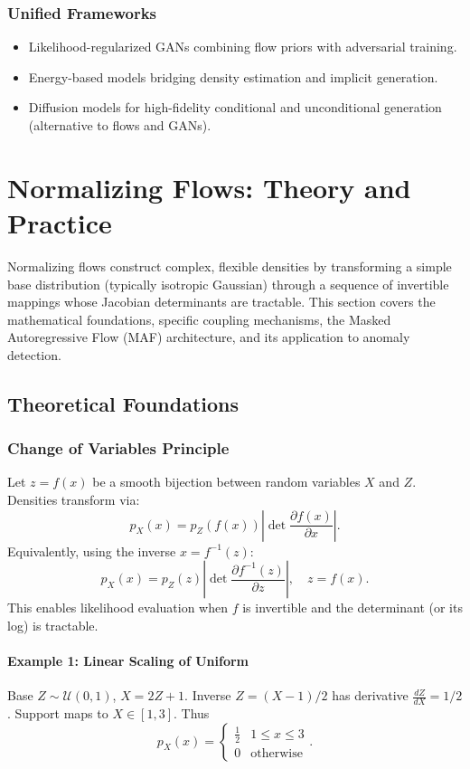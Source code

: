 \documentclass[conference]{IEEEtran}
\begin{document}
\subsubsection{Unified Frameworks}
\begin{itemize}
\item Likelihood-regularized GANs combining flow priors with adversarial training.
\item Energy-based models bridging density estimation and implicit generation.
\item Diffusion models for high-fidelity conditional and unconditional generation (alternative to flows and GANs).
\end{itemize}

\section{Normalizing Flows: Theory and Practice}
Normalizing flows construct complex, flexible densities by transforming a simple base distribution (typically isotropic Gaussian) through a sequence of invertible mappings whose Jacobian determinants are tractable. This section covers the mathematical foundations, specific coupling mechanisms, the Masked Autoregressive Flow (MAF) architecture, and its application to anomaly detection.

\subsection{Theoretical Foundations}

\subsubsection{Change of Variables Principle}
Let $z = f(x)$ be a smooth bijection between random variables $X$ and $Z$. Densities transform via:
\begin{equation}
 p_X(x) = p_Z(f(x)) \left| \det \frac{\partial f(x)}{\partial x} \right|.\label{eq:cov}
\end{equation}
Equivalently, using the inverse $x = f^{-1}(z)$:
\begin{equation}
 p_X(x) = p_Z(z) \left| \det \frac{\partial f^{-1}(z)}{\partial z} \right|,\quad z = f(x).
\end{equation}
This enables likelihood evaluation when $f$ is invertible and the determinant (or its log) is tractable.

\paragraph{Example 1: Linear Scaling of Uniform}
Base $Z \sim \mathcal{U}(0,1)$, $X = 2Z + 1$. Inverse $Z = (X-1)/2$ has derivative $\frac{dZ}{dX}=1/2$. Support maps to $X \in [1,3]$. Thus
\begin{equation}
 p_X(x) = \begin{cases}\frac{1}{2} & 1 \le x \le 3 \\ 0 & \text{otherwise}\end{cases}.
\end{equation}
\end{document}
